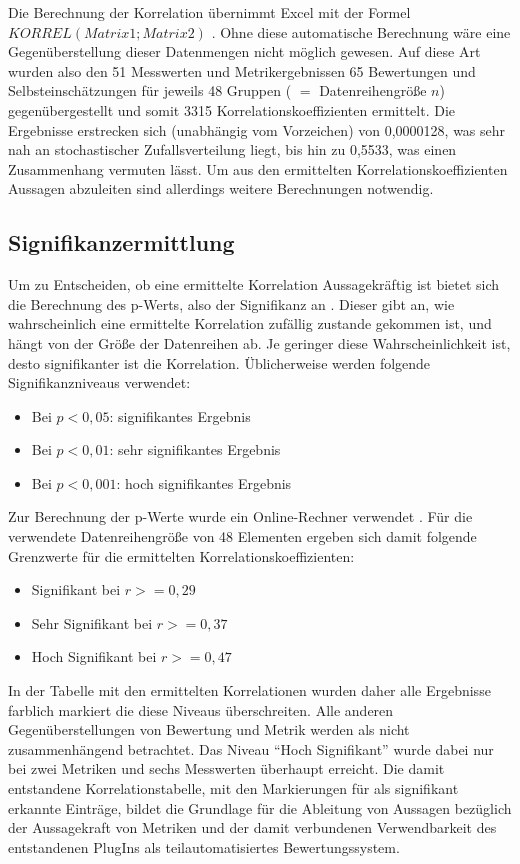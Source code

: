 \documentclass[da,ngerman]{stthesis}
\begin{document}
				Die Berechnung der Korrelation übernimmt Excel mit der Formel $KORREL(Matrix1;Matrix2)$ \cite{ExcelKorrel}. Ohne diese automatische Berechnung wäre eine Gegenüberstellung dieser Datenmengen nicht möglich gewesen. Auf diese Art wurden also den 51 Messwerten und Metrikergebnissen 65 Bewertungen und Selbsteinschätzungen für jeweils 48 Gruppen ( $=$ Datenreihengröße $n$) gegenübergestellt und somit 3315 Korrelationskoeffizienten ermittelt. Die Ergebnisse erstrecken sich (unabhängig vom Vorzeichen) von 0,0000128, was sehr nah an stochastischer Zufallsverteilung liegt, bis hin zu 0,5533, was einen Zusammenhang vermuten lässt. Um aus den ermittelten Korrelationskoeffizienten Aussagen abzuleiten sind allerdings weitere Berechnungen notwendig.
			\subsection{Signifikanzermittlung}
				Um zu Entscheiden, ob eine ermittelte Korrelation Aussagekräftig ist bietet sich die Berechnung des p-Werts, also der Signifikanz an \cite{Signifikanz}. Dieser gibt an, wie wahrscheinlich eine ermittelte Korrelation zufällig zustande gekommen ist, und hängt von der Größe der Datenreihen ab. Je geringer diese Wahrscheinlichkeit ist, desto signifikanter ist die Korrelation. Üblicherweise werden folgende Signifikanzniveaus verwendet:
				\begin{itemize}
					\item Bei $p < 0,05$: signifikantes Ergebnis
					\item Bei $p < 0,01$: sehr signifikantes Ergebnis
					\item Bei $p < 0,001$: hoch signifikantes Ergebnis
				\end{itemize}
				Zur Berechnung der p-Werte wurde ein Online-Rechner verwendet \cite{PValue}. Für die verwendete Datenreihengröße von 48 Elementen ergeben sich damit folgende Grenzwerte für die ermittelten Korrelationskoeffizienten:
				\begin{itemize}
					\item Signifikant bei $r>=0,29$
					\item Sehr Signifikant bei $r>=0,37$
					\item Hoch Signifikant bei $r>=0,47$
				\end{itemize}
				In der Tabelle mit den ermittelten Korrelationen wurden daher alle Ergebnisse farblich markiert die diese Niveaus überschreiten. Alle anderen Gegenüberstellungen von Bewertung und Metrik werden als nicht zusammenhängend betrachtet. Das Niveau "`Hoch Signifikant"' wurde dabei nur bei zwei Metriken und sechs Messwerten überhaupt erreicht. \newline
				Die damit entstandene Korrelationstabelle, mit den Markierungen für als signifikant erkannte Einträge, bildet die Grundlage für die Ableitung von Aussagen bezüglich der Aussagekraft von Metriken und der damit verbundenen Verwendbarkeit des entstandenen PlugIns als teilautomatisiertes Bewertungssystem. 
				\newpage
\end{document}
